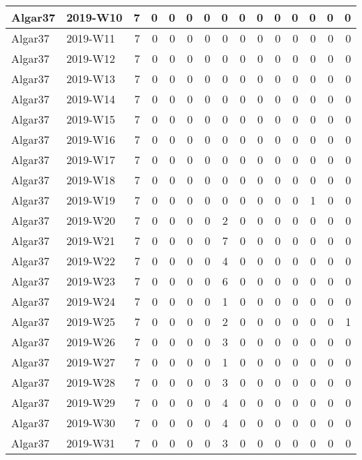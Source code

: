 \documentclass[]{book}
\begin{document}
\begin{table}
\begin{tabular}[t]{l|l|r|r|r|r|r|r|r|r|r|r|r|r|r}
\hline
Algar37 & 2019-W10 & 7 & 0 & 0 & 0 & 0 & 0 & 0 & 0 & 0 & 0 & 0 & 0 & 0\\
\hline
Algar37 & 2019-W11 & 7 & 0 & 0 & 0 & 0 & 0 & 0 & 0 & 0 & 0 & 0 & 0 & 0\\
\hline
Algar37 & 2019-W12 & 7 & 0 & 0 & 0 & 0 & 0 & 0 & 0 & 0 & 0 & 0 & 0 & 0\\
\hline
Algar37 & 2019-W13 & 7 & 0 & 0 & 0 & 0 & 0 & 0 & 0 & 0 & 0 & 0 & 0 & 0\\
\hline
Algar37 & 2019-W14 & 7 & 0 & 0 & 0 & 0 & 0 & 0 & 0 & 0 & 0 & 0 & 0 & 0\\
\hline
Algar37 & 2019-W15 & 7 & 0 & 0 & 0 & 0 & 0 & 0 & 0 & 0 & 0 & 0 & 0 & 0\\
\hline
Algar37 & 2019-W16 & 7 & 0 & 0 & 0 & 0 & 0 & 0 & 0 & 0 & 0 & 0 & 0 & 0\\
\hline
Algar37 & 2019-W17 & 7 & 0 & 0 & 0 & 0 & 0 & 0 & 0 & 0 & 0 & 0 & 0 & 0\\
\hline
Algar37 & 2019-W18 & 7 & 0 & 0 & 0 & 0 & 0 & 0 & 0 & 0 & 0 & 0 & 0 & 0\\
\hline
Algar37 & 2019-W19 & 7 & 0 & 0 & 0 & 0 & 0 & 0 & 0 & 0 & 0 & 1 & 0 & 0\\
\hline
Algar37 & 2019-W20 & 7 & 0 & 0 & 0 & 0 & 2 & 0 & 0 & 0 & 0 & 0 & 0 & 0\\
\hline
Algar37 & 2019-W21 & 7 & 0 & 0 & 0 & 0 & 7 & 0 & 0 & 0 & 0 & 0 & 0 & 0\\
\hline
Algar37 & 2019-W22 & 7 & 0 & 0 & 0 & 0 & 4 & 0 & 0 & 0 & 0 & 0 & 0 & 0\\
\hline
Algar37 & 2019-W23 & 7 & 0 & 0 & 0 & 0 & 6 & 0 & 0 & 0 & 0 & 0 & 0 & 0\\
\hline
Algar37 & 2019-W24 & 7 & 0 & 0 & 0 & 0 & 1 & 0 & 0 & 0 & 0 & 0 & 0 & 0\\
\hline
Algar37 & 2019-W25 & 7 & 0 & 0 & 0 & 0 & 2 & 0 & 0 & 0 & 0 & 0 & 0 & 1\\
\hline
Algar37 & 2019-W26 & 7 & 0 & 0 & 0 & 0 & 3 & 0 & 0 & 0 & 0 & 0 & 0 & 0\\
\hline
Algar37 & 2019-W27 & 7 & 0 & 0 & 0 & 0 & 1 & 0 & 0 & 0 & 0 & 0 & 0 & 0\\
\hline
Algar37 & 2019-W28 & 7 & 0 & 0 & 0 & 0 & 3 & 0 & 0 & 0 & 0 & 0 & 0 & 0\\
\hline
Algar37 & 2019-W29 & 7 & 0 & 0 & 0 & 0 & 4 & 0 & 0 & 0 & 0 & 0 & 0 & 0\\
\hline
Algar37 & 2019-W30 & 7 & 0 & 0 & 0 & 0 & 4 & 0 & 0 & 0 & 0 & 0 & 0 & 0\\
\hline
Algar37 & 2019-W31 & 7 & 0 & 0 & 0 & 0 & 3 & 0 & 0 & 0 & 0 & 0 & 0 & 0\\

\end{tabular}
\end{table}
\end{document}
